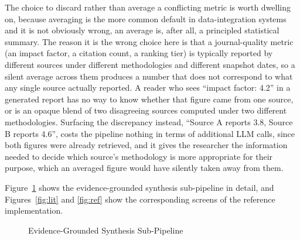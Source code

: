 \documentclass[12pt,a4paper]{report}
\begin{document}
The choice to discard rather than average a conflicting metric is worth
dwelling on, because averaging is the more common default in data-integration
systems and it is not obviously wrong, an average is, after all, a
principled statistical summary. The reason it is the wrong choice here is that
a journal-quality metric (an impact factor, a citation count, a ranking tier)
is typically reported by different sources under different methodologies and
different snapshot dates, so a silent average across them produces a number
that does not correspond to what any single source actually reported. A
reader who sees ``impact factor: 4.2'' in a generated report has no way to
know whether that figure came from one source, or is an opaque blend of two
disagreeing sources computed under two different methodologies. Surfacing the
discrepancy instead, ``Source A reports 3.8, Source B reports 4.6'', costs
the pipeline nothing in terms of additional LLM calls, since both figures were
already retrieved, and it gives the researcher the information needed to
decide which source's methodology is more appropriate for their purpose,
which an averaged figure would have silently taken away from them.

Figure~\ref{fig:arch} shows the evidence-grounded synthesis sub-pipeline in
detail, and Figures~\ref{fig:lit} and \ref{fig:ref} show the corresponding
screens of the reference implementation.

\begin{figure}[H]
\centering
{}
\caption{Evidence-Grounded Synthesis Sub-Pipeline}
\label{fig:arch}
\end{figure}
\end{document}
